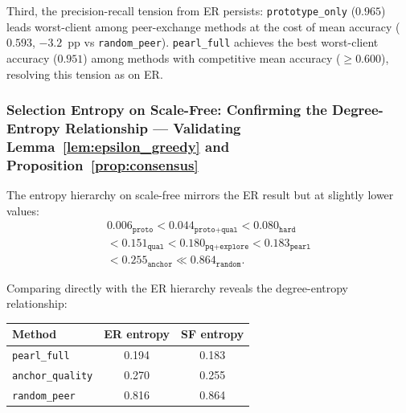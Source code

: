 \documentclass[conference]{IEEEtran}
\begin{document}
Third, the precision-recall tension from ER persists: \texttt{prototype\_only} ($0.965$) leads worst-client among peer-exchange methods at the cost of mean accuracy ($0.593$, $-3.2$~pp vs \texttt{random\_peer}). \texttt{pearl\_full} achieves the best worst-client accuracy ($0.951$) among methods with competitive mean accuracy ($\geq0.600$), resolving this tension as on ER.

\subsubsection{Selection Entropy on Scale-Free: Confirming the Degree-Entropy Relationship — Validating Lemma~\ref{lem:epsilon_greedy} and Proposition~\ref{prop:consensus}}
\label{subsubsec:sf-entropy}

The entropy hierarchy on scale-free mirrors the ER result but at slightly lower values:
\begin{equation}
\begin{gathered}
0.006_{\texttt{proto}} < 0.044_{\texttt{proto+qual}} <
0.080_{\texttt{hard}}\\
< 0.151_{\texttt{qual}} < 0.180_{\texttt{pq+explore}} <
0.183_{\texttt{pearl}}\\
< 0.255_{\texttt{anchor}} \ll 0.864_{\texttt{random}}.
\end{gathered}
\end{equation}

Comparing directly with the ER hierarchy reveals the degree-entropy relationship:

\begin{center}
\begin{tabular}{lcc}
\toprule
\textbf{Method} & \textbf{ER entropy} & \textbf{SF entropy} \\
\midrule
\texttt{pearl\_full}     & 0.194 & 0.183 \\
\texttt{anchor\_quality} & 0.270 & 0.255 \\
\texttt{random\_peer}    & 0.816 & 0.864 \\
\bottomrule
\end{tabular}
\end{center}
\end{document}
